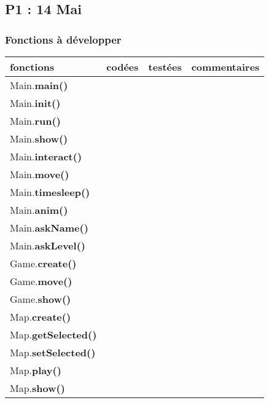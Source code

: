 \documentclass[a4paper]{article}
\begin{document}
        \subsection{P1 : 14 Mai}
            \subsubsection{Fonctions à développer}
            \begin{tabular}{|l|c|c|c|}
                \hline
                fonctions & codées & testées & commentaires \\
                \hline
                Main.\textbf{main()} & & & \\
                \hline
                Main.\textbf{init()} & & & \\
                \hline
                Main.\textbf{run()}  & & & \\
                \hline
                Main.\textbf{show()} & & & \\
                \hline
                Main.\textbf{interact()} & & & \\
                \hline
                Main.\textbf{move()} & & & \\
                \hline
                Main.\textbf{timesleep()} & & & \\
                \hline
                Main.\textbf{anim()} & & & \\
                \hline 
                Main.\textbf{askName()} & & & \\
                \hline
                Main.\textbf{askLevel()} & & & \\
                \hline
                \hline
                Game.\textbf{create()} & & & \\
                \hline
                Game.\textbf{move()} & & & \\
                \hline
                Game.\textbf{show()} & & & \\
                \hline 
                \hline
                Map.\textbf{create()} & & & \\
                \hline
                Map.\textbf{getSelected()} & & & \\
                \hline
                Map.\textbf{setSelected()} & & & \\
                \hline
                Map.\textbf{play()} & & & \\
                \hline
                Map.\textbf{show()} & & & \\

\end{tabular}
\end{document}
